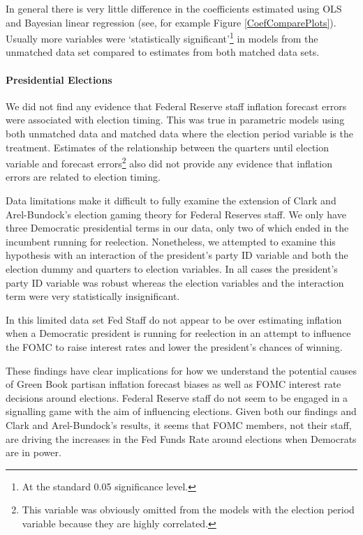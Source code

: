 \documentclass[a4paper]{article}\usepackage{graphicx, color}
\begin{document}
In general there is very little difference in the coefficients estimated using OLS and Bayesian linear regression (see, for example Figure \ref{CoefComparePlots}). Usually more variables were `statistically significant'\footnote{At the standard 0.05 significance level.} in models from the unmatched data set compared to estimates from both matched data sets.

\paragraph{Presidential Elections}

We did not find any evidence that Federal Reserve staff inflation forecast errors were associated with election timing. This was true in parametric models using both unmatched data and matched data where the election period variable is the treatment. Estimates of the relationship between the quarters until election variable and forecast errors\footnote{This variable was obviously omitted from the models with the election period variable because they are highly correlated.} also did not provide any evidence that inflation errors are related to election timing. 

Data limitations make it difficult to fully examine the extension of Clark and Arel-Bundock's \citeyearpar{Clark2011} election gaming theory for Federal Reserves staff. We only have three Democratic presidential terms in our data, only two of which ended in the incumbent running for reelection. Nonetheless, we attempted to examine this hypothesis with an interaction of the president's party ID variable and both the election dummy and quarters to election variables. In all cases the president's party ID variable was robust whereas the election variables and the interaction term were very statistically insignificant.

In this limited data set Fed Staff do not appear to be over estimating inflation when a Democratic president is running for reelection in an attempt to influence the FOMC to raise interest rates and lower the president's chances of winning. 

These findings have clear implications for how we understand the potential causes of Green Book partisan inflation forecast biases as well as FOMC interest rate decisions around elections. Federal Reserve staff do not seem to be engaged in a signalling game with the aim of influencing elections. Given both our findings and Clark and Arel-Bundock's results, it seems that FOMC members, not their staff, are driving the increases in the Fed Funds Rate around elections when Democrats are in power. 
\end{document}
